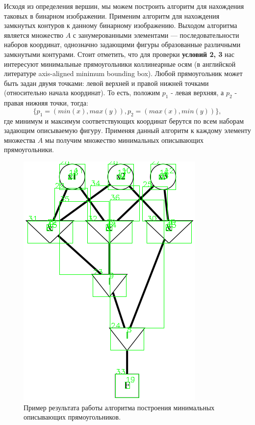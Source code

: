 \documentclass[makeidx, a4paper, 14pt]{extarticle}
\begin{document}
Исходя из определения вершин, мы можем построить алгоритм для нахождения таковых в бинарном изображении.
Применим алгоритм для нахождения замкнутых контуров \cite{suzuki85} к данному бинарному изображению.
Выходом алгоритма является множество $A$ с занумерованными элементами --- последовательности наборов координат, однозначно
задающими фигуры образованные различными замкнутыми контурами. Стоит отметить, что для проверки \textbf{условий 2, 3} нас интересуют минимальные прямоугольники
коллинеарные осям (в английской литературе axis-aligned minimum bounding box). Любой прямоугольник может быть задан
двумя точками: левой верхней и правой нижней точками (относительно начала координат). То есть, положим $p_{1}$ - левая верхняя,
а $p_2$ - правая нижняя точки, тогда: \[ \{ p_1=(min(x), max(y)), p_2=(max(x), min(y)) \}, \]
где минимум и максимум соответствующих координат берутся по всем наборам задающим описываемую фигуру.
Применяя данный алгоритм к каждому элементу множества $A$ мы получим множество минимальных описывающих прямоугольники. \\

\begin{figure}[H]
    \centering
    \includegraphics[scale=0.75]{img4_contours.png}
    \caption{Пример результата работы алгоритма построения минимальных описывающих прямоугольников.}
\end{figure}
\end{document}
